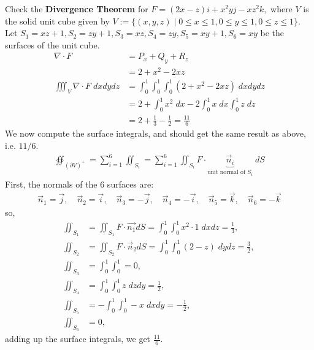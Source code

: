 \documentclass[12pt]{book}
\theoremstyle{definition}
\theoremstyle{remark}
\begin{document}
\begin{example}Check the \textbf{Divergence Theorem} for $F = (2x-z)i + x^2 y j - xz^2 k,$ where $V$ is the solid unit cube given by $V := \{ (x,y,z) \mid 0\leq x \leq 1, 0 \leq y \leq 1, 0\leq z \leq 1\}$. Let $S_1 =xz +1, S_2=zy+1, S_3=xz, S_4 =zy, S_5 =xy+1, S_6=xy$ be the surfaces of the unit cube. 
    \begin{equation*}
    \begin{split}
      \nabla \cdot {F} &= P_x + Q_y + R_z \\ 
      &= 2 + x^2-2xz \\ 
      \iiint_V \nabla \cdot F \; dxdydz &=  \int_0 ^1 \int_0^1 \int_0^1 (2 + x^2 - 2xz) \; dx dydz\\ 
       &= 2 + \int_0^1 x^2 \; dx - 2 \int_0^1 x \; dx \int_0^1 z \; dz \\ 
       &= 2 + \frac{1}{3} -\frac{1}{2} = \frac{11}{6}
    \end{split}
  \end{equation*}
  We now compute the surface integrals, and should get the same result as above, i.e. $11/6$. 
  \begin{equation*}
    \begin{split}
      \oiint_{(\partial V)^+} = \sum^{6}_{i=1} \iint_{S_i} = \sum^{6}_{i=1} \iint_{S_i} F \cdot \underbrace{\vec n_i}_{\text{unit normal of }S_i} \; dS
    \end{split}
  \end{equation*}
  First, the normals of the 6 surfaces are: 
  \begin{equation*}
    \begin{split}
    \vec n_1 = \vec j, \quad \vec n_2= \vec i , \quad \vec n_3 = -\vec j, \quad \vec n_4 = -\vec i ,  \quad \vec n_5 =\vec k ,  \quad \vec n_6 = -\vec k    \end{split}
  \end{equation*}
  so, 
  \begin{equation*}
    \begin{split}
      \iint_{S_1} &= \iint_{S_1} F \cdot {\vec{{n_1}} {}} dS = \int_0^1 \int_0^1 x^2 \cdot 1 \; dx dz = \frac{1}{3}, \\ 
      \iint_{S_2} &= \iint_{S_2} F \cdot \vec n_2 dS = \int_0 ^1 \int_0^1 (2 -z) \; dy dz = \frac{3}{2}, \\ 
      \iint_{S_3} &= \int_0^1 \int_0^1 = 0 ,\\ 
      \iint_{S_4} &= \int_0^1 \int_0^1 z \; dz dy = \frac{1}{2}, \\ 
      \iint_{S_5}& = - \int_0^1 \int_0^1 -x \; dx dy = -\frac{1}{2}, \\ 
      \iint_{S_6} &=  0,
    \end{split}
  \end{equation*}
  adding up the surface integrals, we get $\frac{11}{6}$.
\end{example}
\end{document}
